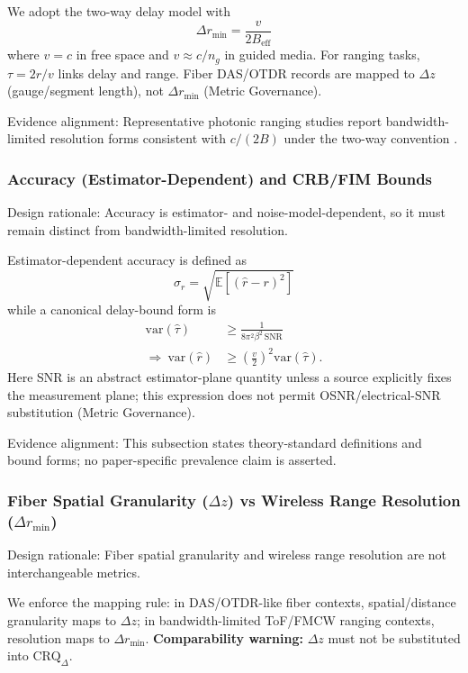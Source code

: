\documentclass[lettersize,journal]{IEEEtran}
\begin{document}
We adopt the two-way delay model with
\begin{equation}
\Delta r_{\min} = \frac{v}{2B_{\text{eff}}}
\end{equation}
where \(v=c\) in free space and \(v\approx c/n_g\) in guided media. For ranging tasks, \(\tau=2r/v\) links delay and range. Fiber DAS/OTDR records are mapped to \(\Delta z\) (gauge/segment length), not \(\Delta r_{\min}\) (Metric Governance).

Evidence alignment: Representative photonic ranging studies report bandwidth-limited resolution forms consistent with \(c/(2B)\) under the two-way convention \cite{O_ISAC_026,O_ISAC_034}.

\subsubsection{Accuracy (Estimator-Dependent) and CRB/FIM Bounds}
Design rationale: Accuracy is estimator- and noise-model-dependent, so it must remain distinct from bandwidth-limited resolution.

Estimator-dependent accuracy is defined as
\begin{equation}
\sigma_r = \sqrt{\mathbb{E}[(\hat r-r)^2]}
\end{equation}
while a canonical delay-bound form is
\begin{equation}
\begin{split}
\mathrm{var}(\hat\tau) &\ge \frac{1}{8\pi^2\beta^2\,\mathrm{SNR}} \\
\Rightarrow\ \mathrm{var}(\hat r) &\ge \left(\frac{v}{2}\right)^2\mathrm{var}(\hat\tau).
\end{split}
\end{equation}
Here SNR is an abstract estimator-plane quantity unless a source explicitly fixes the measurement plane; this expression does not permit OSNR/electrical-SNR substitution (Metric Governance).

Evidence alignment: This subsection states theory-standard definitions and bound forms; no paper-specific prevalence claim is asserted.

\subsubsection{Fiber Spatial Granularity (\(\Delta z\)) vs Wireless Range Resolution (\(\Delta r_{\min}\))}
Design rationale: Fiber spatial granularity and wireless range resolution are not interchangeable metrics.

We enforce the mapping rule: in DAS/OTDR-like fiber contexts, spatial/distance granularity maps to \(\Delta z\); in bandwidth-limited ToF/FMCW ranging contexts, resolution maps to \(\Delta r_{\min}\). \textbf{Comparability warning:} \(\Delta z\) must not be substituted into \(\mathrm{CRQ}_{\Delta}\).
\end{document}

